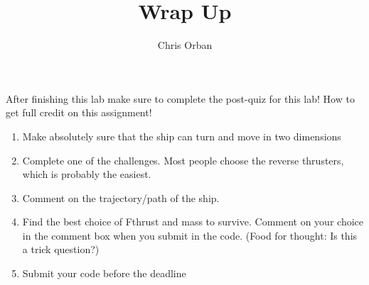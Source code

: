 \documentclass{ximera}
\author{Chris Orban}
\title{Wrap Up}
\begin{document}
\maketitle

After finishing this lab make sure to complete the post-quiz for this
lab!  How to get full credit on this assignment!

\begin{enumerate}
\item Make absolutely sure that the ship can turn and move in two dimensions
\item Complete one of the challenges.  Most people choose the reverse thrusters, which is probably the easiest.
\item Comment on the trajectory/path of the ship.
\item Find the best choice of Fthrust and mass to survive.  Comment on your choice in the comment box when you submit in the code. (Food for thought: Is this a trick question?)
\item Submit your code before the deadline
\end{enumerate}
\end{document}
